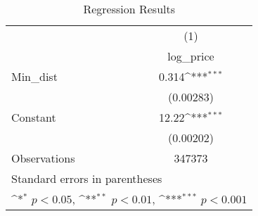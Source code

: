 {
\def\sym#1{\ifmmode^{#1}\else\(^{#1}\)\fi}
\begin{longtable}{l*{1}{c}}
\caption{Regression Results}\\
\toprule\endfirsthead\midrule\endhead\midrule\endfoot\endlastfoot
                    &\multicolumn{1}{c}{(1)}\\
                    &\multicolumn{1}{c}{log\_price}\\
\midrule
Min\_dist            &       0.314\sym{***}\\
                    &   (0.00283)         \\
\addlinespace
Constant            &       12.22\sym{***}\\
                    &   (0.00202)         \\
\midrule
Observations        &      347373         \\
\bottomrule
\multicolumn{2}{l}{\footnotesize Standard errors in parentheses}\\
\multicolumn{2}{l}{\footnotesize \sym{*} \(p<0.05\), \sym{**} \(p<0.01\), \sym{***} \(p<0.001\)}\\
\end{longtable}
}
